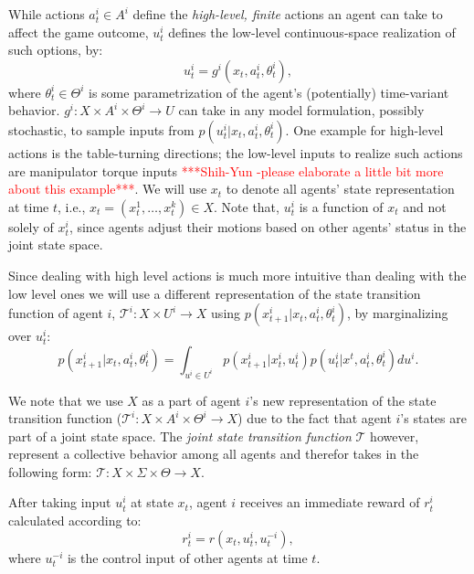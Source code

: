 \documentclass[letterpaper, 10 pt, conference]{ieeeconf}  %
\begin{document}
While actions $a_t^i \in A^i$ define the \textit{high-level, finite} actions an 
agent can take to affect the game outcome, $u_t^i$ defines the low-level continuous-space
realization of such options, by:
\begin{equation}\label{eq:g_function}
  u_t^i = g^i(x_t, a^i_t, \theta^i_t),
\end{equation}
where $\theta^i_t \in \Theta^i$ is some parametrization of the agent's (potentially) time-variant behavior.
$g^i:X \times A^i \times \Theta^i \rightarrow U$ can take in any model 
formulation, possibly stochastic, to sample inputs from $p(u_t^i|x_t,a^i_t,\theta_t^i)$. 
One example for high-level actions is the table-turning directions; the low-level inputs to realize such actions are manipulator torque inputs \textcolor{red}{***Shih-Yun -please elaborate a little bit more about this example***}. We will use $x_t$ to denote all agents' state representation at time $t$, i.e., $x_t = (x^1_t,\ldots,x^k_t) \in X$. Note that, $u_t^i$ is a function of $x_t$ and not solely of $x^i_t$, since agents adjust their motions based on other agents' status in the joint state space. 

Since dealing with high level actions is much more intuitive than dealing with the low level ones we will use a different representation of the state transition function of agent $i$, $\mathcal{T}^i:X \times U^i \rightarrow X$ using $p(x^i_{t+1}|x_t,a^i_t,\theta^i_t)$, by marginalizing over $u^i_t$:
\begin{equation}
  p(x^i_{t+1}|x_t,a^i_t,\theta^i_t) = \int_{u^i \in U^i} 
  p(x_{t+1}^i|x^i_t,u^i_t) p(u^i_t|x^t,a^i_t,\theta^i_t)du^i.
\end{equation}

We note that we use $X$ as a part of agent $i$'s new representation of the state transition function ($\mathcal{T}^i:X \times A^i \times \Theta^i \rightarrow X$) due to the fact that agent $i$'s states are part of a joint state space. The \textit{joint state transition function} $\mathcal{T}$ however, represent a collective behavior among all agents and therefor takes in the following form: $\mathcal{T}:X \times \Sigma \times \Theta \rightarrow X$. 

After taking input $u_t^i$ at state $x_t$, agent $i$ receives an immediate reward of $r^i_t$ calculated according to: 
\begin{equation}\label{eq:r_control_input}
  r^i_t = r(x_t,u^i_t,u^{-i}_t),
\end{equation}
where $u^{-i}_t$ is the control input of other agents at time $t$. 
\end{document}
